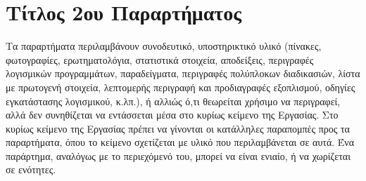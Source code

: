 
 
\chapter{Τίτλος 2ου Παραρτήματος\label{appendixB}}

Τα παραρτήματα περιλαμβάνουν συνοδευτικό, υποστηρικτικό υλικό (πίνακες, φωτογραφίες, ερωτηματολόγια, στατιστικά στοιχεία, αποδείξεις, περιγραφές  λογισμικών  προγραμμάτων,  παραδείγματα,  περιγραφές 
πολύπλοκων διαδικασιών, λίστα με πρωτογενή στοιχεία, λεπτομερής περιγραφή και προδιαγραφές εξοπλισμού, οδηγίες εγκατάστασης λογισμικού, κ.λπ.), ή αλλιώς ό,τι θεωρείται χρήσιμο να περιγραφεί, αλλά δεν συνηθίζεται να 
εντάσσεται μέσα στο κυρίως κείμενο της Εργασίας.  Στο κυρίως κείμενο της Εργασίας πρέπει να γίνονται οι κατάλληλες παραπομπές προς τα παραρτήματα, όπου το κείμενο σχετίζεται με υλικό που περιλαμβάνεται σε αυτά. Ένα παράρτημα, αναλόγως με το περιεχόμενό του, μπορεί να είναι ενιαίο, ή να χωρίζεται σε ενότητες.